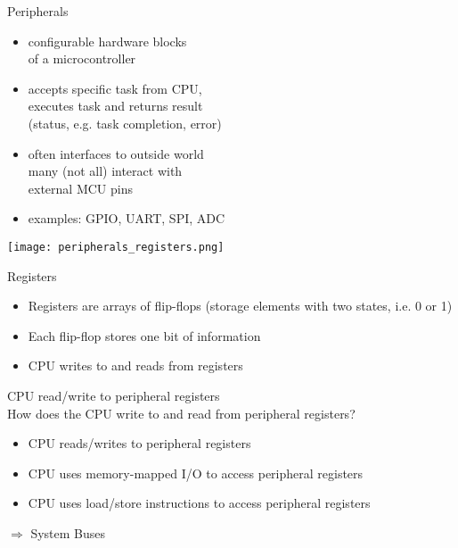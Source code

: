 \begin{definition}{Peripherals}

    \begin{minipage}{0.35\linewidth}
    \begin{itemize}
        \item configurable hardware blocks \\ of a microcontroller
        \item accepts specific task from CPU, \\ executes task and returns result \\ (status, e.g. task completion, error)
        \item often interfaces to outside world\\
        many (not all) interact with \\ external MCU pins 
        \item examples: GPIO, UART, SPI, ADC
    \end{itemize}
    \end{minipage}
    \begin{minipage}{0.64\linewidth}
        \vspace{-5mm}
        \texttt{[image: peripherals\_registers.png]}
    \end{minipage}
\end{definition}


\begin{definition}{Registers}
    \begin{itemize}
        \item Registers are arrays of flip-flops (storage elements with two states, i.e. 0 or 1)
        \item Each flip-flop stores one bit of information
        \item CPU writes to and reads from registers
    \end{itemize}
\end{definition}

\begin{theorem}{CPU read/write to peripheral registers}\\
    How does the CPU write to and read from peripheral registers?
    \vspace{-2mm}\\
    \begin{itemize}
        \item CPU reads/writes to peripheral registers
        \item CPU uses memory-mapped I/O to access peripheral registers
        \item CPU uses load/store instructions to access peripheral registers
    \end{itemize}
    $\Rightarrow$ System Buses
\end{theorem}

